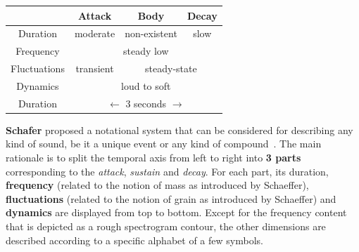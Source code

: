 \documentclass[a0,portrait,15pt]{a0poster}
\begin{document}
\begin{multicols}{2}
\begin{center}
\begin{tabular}{|c|c|c|c|}
\hline
& Attack & Body & Decay \\
\hline
Duration & moderate & non-existent & slow \\
\hline
Frequency  & \multicolumn{3}{c|}{steady low} \\
\hline
Fluctuations  & transient & \multicolumn{2}{c|}{steady-state} \\
\hline
Dynamics  & \multicolumn{3}{c|}{loud to soft} \\
\hline
Duration & \multicolumn{3}{c|}{ $\longleftarrow$ 3 seconds $\longrightarrow$ } \\
\hline
\end{tabular}
\end{center}\vspace{1cm}

\color{SaddleBrown}

\textbf{Schafer} proposed a notational system that can be considered for describing any kind of sound, be it a unique event or any kind of compound~\cite{Schafer1977}. The main rationale is to split the temporal axis from left to right into \textbf{3 parts} corresponding to the \textit{attack}, \textit{sustain} and \textit{decay}. For each part, its duration, \textbf{frequency} (related to the notion of mass as introduced by Schaeffer), \textbf{fluctuations} (related to the notion of grain as introduced by Schaeffer) and \textbf{dynamics} are displayed from top to bottom. Except for the frequency content that is depicted as a rough spectrogram contour, the other dimensions are described according to a specific alphabet of a few symbols.

\begin{center}\vspace{1cm}
  \begin{minipage}[b]{.4\linewidth}
  \end{minipage}
\begin{minipage}[b]{.5\linewidth}
\end{minipage}
\end{center}\vspace{1cm}


\end{multicols}
\end{document}
